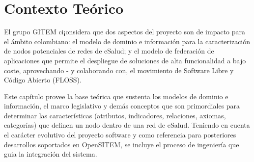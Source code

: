 \chapter{Contexto Teórico}

El grupo GITEM ci¡onsidera que dos aspectos del proyecto son de impacto para el ámbito colombiano: el modelo de dominio e información para la caracterización de nodos potenciales de redes de eSalud; y el modelo de federación de aplicaciones que permite el despliegue de soluciones de alta funcionalidad a bajo coste, aprovechando - y colaborando con, el movimiento de Software Libre y Código Abierto (FLOSS).

Este capítulo provee la base teórica que sustenta los modelos de dominio e información, el marco legislativo y demás conceptos que son primordiales para determinar las características (atributos, indicadores, relaciones, axiomas, categorías) que definen un nodo dentro de una red de eSalud. Teniendo en cuenta el carácter evolutivo del proyecto software y como referencia para posteriores desarrollos soportados en  OpenSITEM, se incluye el proceso de ingeniería que guia la integración del sistema.




